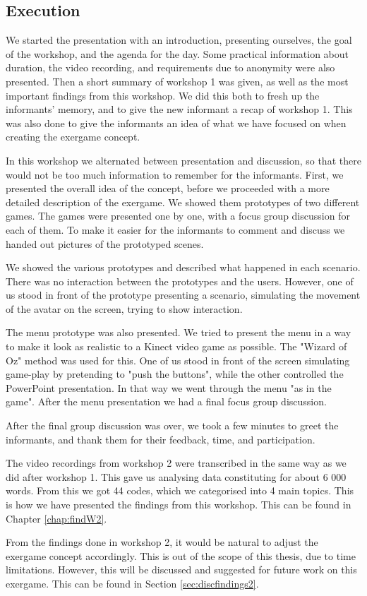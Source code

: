 \subsection{Execution}
We started the presentation with an introduction, presenting ourselves, the goal of the workshop, and the agenda for the day. Some practical information about duration, the video recording, and requirements due to anonymity were also presented. Then a short summary of workshop 1 was given, as well as the most important findings from this workshop. We did this both to fresh up the informants' memory, and to give the new informant a recap of workshop 1. This was also done to give the informants an idea of what we have focused on when creating the exergame concept.    

In this workshop we alternated between presentation and discussion, so that there would not be too much information to remember for the informants. First, we presented the overall idea of the concept, before we proceeded with a more detailed description of the exergame. We showed them prototypes of two different games. The games were presented one by one, with a focus group discussion for each of them. To make it easier for the informants to comment and discuss we handed out pictures of the prototyped scenes.

We showed the various prototypes and described what happened in each scenario. There was no interaction between the prototypes and the users. However, one of us stood in front of the prototype presenting a scenario, simulating the movement of the avatar on the screen, trying to show interaction. 

The menu prototype was also presented. We tried to present the menu in a way to make it look as realistic to a Kinect video game as possible. The "Wizard of Oz" method was used for this. One of us stood in front of the screen simulating game-play by pretending to "push the buttons", while the other controlled the PowerPoint presentation. In that way we went through the menu "as in the game". After the menu presentation we had a final focus group discussion. 

After the final group discussion was over, we took a few minutes to greet the informants, and thank them for their feedback, time, and participation. 

The video recordings from workshop 2 were transcribed in the same way as we did after workshop 1. This gave us analysing data constituting for about 6 000 words.  From this we got 44 codes, which we categorised into 4 main topics. This is how we have presented the findings from this workshop. This can be found in Chapter \ref{chap:findW2}.

From the findings done in workshop 2, it would be natural to adjust the exergame concept accordingly. This is out of the scope of this thesis, due to time limitations. However, this will be discussed and suggested for future work on this exergame. This can be found in Section \ref{sec:discfindings2}.

 
 
 

